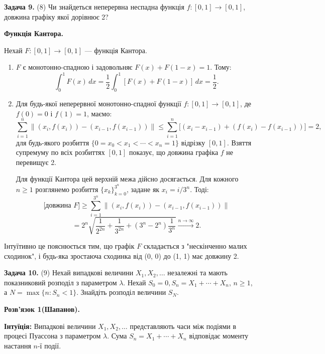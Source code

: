 \documentclass{article}
\begin{document}
\bigskip

\noindent\textbf{Задача 9.} (8) Чи знайдеться неперервна неспадна функція \( f : [0,1] \to [0,1] \), довжина графіку якої дорівнює 2?

\textbf{Функція Кантора.}

Нехай \( F : [0, 1] \to [0, 1] \) — функція Кантора.

\begin{enumerate}
    \item \( F \) є монотонно-спадною і задовольняє \( F(x) + F(1 - x) = 1 \). Тому:
    \[
    \int_0^1 F(x) \, dx = \frac{1}{2} \int_0^1 [F(x) + F(1 - x)] \, dx = \frac{1}{2}.
    \]

    \item Для будь-якої неперервної монотонно-спадної функції \( f : [0, 1] \to [0, 1] \), де \( f(0) = 0 \) і \( f(1) = 1 \), маємо:
    \[
    \sum_{i=1}^n \lVert (x_i, f(x_i)) - (x_{i-1}, f(x_{i-1})) \rVert \leq \sum_{i=1}^n \big[(x_i - x_{i-1}) + (f(x_i) - f(x_{i-1})) \big] = 2,
    \]
    для будь-якого розбиття \( \{0 = x_0 < x_1 < \cdots < x_n = 1\} \) відрізку \([0,1]\). Взяття супремуму по всіх розбиттях \([0,1]\) показує, що довжина графіка \( f \) не перевищує 2.

    Для функції Кантора цей верхній межа дійсно досягається. Для кожного \( n \geq 1 \) розглянемо розбиття \( \{x_k\}_{k=0}^{3^n} \), задане як \( x_i = i / 3^n \). Тоді:
    \[
    \text{[довжина } F] \geq \sum_{i=1}^{3^n} \lVert (x_i, f(x_i)) - (x_{i-1}, f(x_{i-1})) \rVert
    \]
    \[
    = 2^n \sqrt{\frac{1}{2^{2n}} + \frac{1}{3^{2n}} + (3^n - 2^n)\frac{1}{3^n}} \xrightarrow{n \to \infty} 2.
    \]
\end{enumerate}

Інтуїтивно це пояснюється тим, що графік \( F \) складається з "нескінченно малих сходинок", і будь-яка зростаюча сходинка від (0, 0) до (1, 1) має довжину 2.

\bigskip

\noindent\textbf{Задача 10.} (9) Нехай випадкові величини \(X_1, X_2, \dots\) незалежні та мають показниковий розподіл з параметром \(\lambda\). Нехай \(S_0 = 0, S_n = X_1 + \cdots + X_n\), \(n \geq 1\), а \(N = \max\{n : S_n < 1\}\). Знайдіть розподіл величини \(S_N\).

\textbf{Розв’язок 1(Шапанов).}  

\textbf{Інтуїція:} Випадкові величини \(X_1, X_2, \dots\) представляють часи між подіями в процесі Пуассона з параметром \(\lambda\). Сума \(S_n = X_1 + \cdots + X_n\) відповідає моменту настання \(n\)-ї події.  
\end{document}

